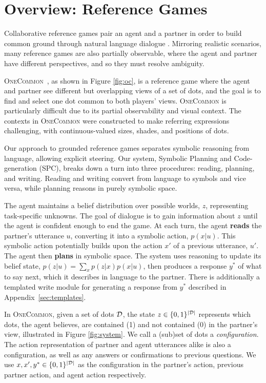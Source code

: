 \documentclass[11pt]{article}
\newcommand{\system}{SPC}
\begin{document}
\section{Overview: Reference Games}
Collaborative reference games
pair an agent and a partner in order to build common ground through natural language dialogue \citep{pb,pip,mf,onecommon}.
Mirroring realistic scenarios, many reference games are also partially observable,
where the agent and partner have different perspectives, and so they must resolve ambiguity.

\textsc{OneCommon}~\citep{onecommon}, as shown in Figure \ref{fig:oc}, is a reference game
where the agent and partner see different but overlapping views of a set of dots, and the goal is to find and select one dot common to both players' views.
\textsc{OneCommon} is particularly difficult due to its partial observability and visual context.
The contexts in \textsc{OneCommon} were constructed to make referring expressions challenging, with continuous-valued sizes, shades, and positions of dots.

Our approach to grounded reference games separates symbolic reasoning from language, allowing explicit steering.
Our system, Symbolic Planning and Code-generation (\system{}), breaks down a turn into three procedures: reading, planning, and writing.
Reading and writing convert from language to symbols and vice versa,
while planning reasons in purely symbolic space.

The agent maintains a belief distribution over possible worlds, $z$, representing task-specific unknowns.
The goal of dialogue is to gain information about $z$ until the agent is confident enough to end the game.
At each turn, the agent \textbf{reads} the partner's utterance $u$, converting it into a symbolic action, $p(x|u)$. This symbolic action potentially builds upon the action $x'$ of a previous utterance, $u'$.
The agent then \textbf{plans} in symbolic space.
The system uses reasoning to update its belief state, $p(z|u)=\sum_x p(z|x)p(x|u)$,
then produces a response $y^*$ of what to say next, which it describes in language to the partner. There is additionally a templated write module for generating a response from $y^*$ described in Appendix~\ref{sec:templates}.

In \textsc{OneCommon}, given a set of dots $\mathcal{D}$, the state $z \in \{0, 1\}^{|\mathcal{D}|}$ represents which dots, the agent believes, are contained (1) and not contained (0) in the partner's view, illustrated in Figure \ref{fig:system}. We call a (sub)set of dots a \textit{configuration}.
The action representation of partner and agent utterances alike is also a configuration, as well as any answers or confirmations to previous questions.
We use $x, x', y^* \in \{0, 1\}^{|\mathcal{D}|}$ as the configuration in the partner's action, previous partner action, and agent action respectively.
\end{document}
